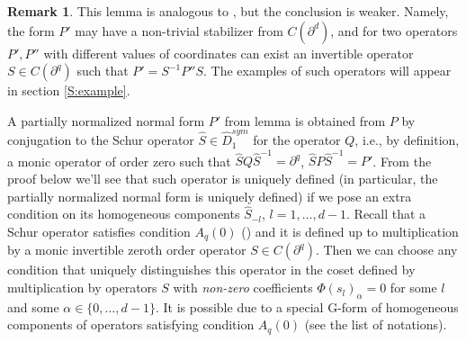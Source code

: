 \documentclass[11pt]{article}
\theoremstyle{definition}
\newtheorem{rem}{Remark}[section]
\theoremstyle{plain}
\numberwithin{equation}{section}
\begin{document}
\begin{rem}
\label{R:normalisation}
This lemma is analogous to \cite[Lem. 3.4]{GZ24}, but the conclusion is weaker. Namely, the form $P'$ may have a non-trivial stabilizer from $C(\partial^d)$, and for two operators $P',P''$ with different values of coordinates can exist an invertible operator $S\in C(\partial^q)$  such that $P'=S^{-1}P''S$. The examples of such operators will appear in section \ref{S:example}. 

A partially normalized normal form $P'$ from lemma is obtained from $P$ by conjugation to the Schur operator $\hat{S}\in \hat{D}_1^{sym}$ for the operator $Q$, i.e., by definition, a monic operator of order zero such that $\hat{S}Q\hat{S}^{-1}=\partial^q$, $\hat{S}P\hat{S}^{-1}=P'$. From the proof below we'll see that such operator is uniquely defined (in particular, the partially normalized normal form is uniquely defined) if we pose an extra condition on its homogeneous components $\hat{S}_{-l}$, $l=1,\ldots ,d-1$. Recall that a Schur operator satisfies condition $A_q(0)$ (\cite[Prop. 2.5, Cor. 2.3]{GZ24}) and it  is defined up to multiplication by a monic invertible zeroth order operator $S\in C(\partial^q)$. Then we can choose any condition that uniquely distinguishes this operator in the coset defined by multiplication by  operators $S$ with {\it non-zero} coefficients  $\Phi (s_{l})_{\alpha}=0$ for some $l$ and some $\alpha \in \{0, \ldots , d-1\}$. It is possible due to a special G-form of homogeneous components of operators satisfying condition $A_q(0)$ (see the list of notations).
\end{rem}
\end{document}
